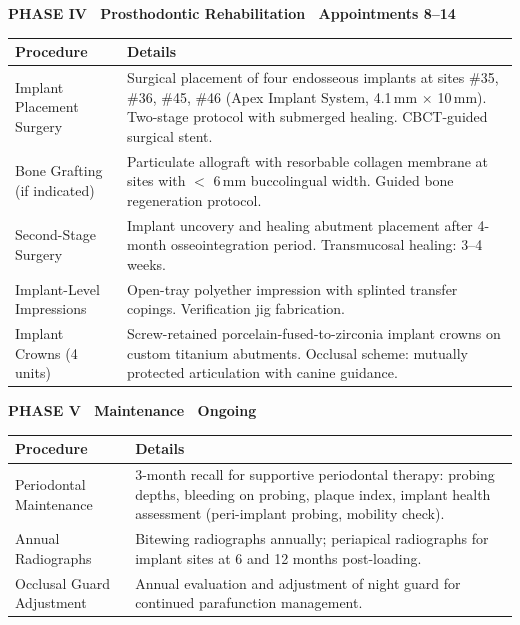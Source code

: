 \documentclass[11pt,a4paper]{article}
\begin{document}
\vspace{3mm}

\begin{phasebox}[colback=success!10, colframe=success!60]
  {\bfseries\color{success!70!black}PHASE IV \textbar\ Prosthodontic Rehabilitation \textbar\ Appointments 8--14}\\[2mm]
  \begin{tabular}{@{}L{7cm} L{7cm}@{}}
    \textbf{Procedure} & \textbf{Details} \\ \midrule
    Implant Placement Surgery & Surgical placement of four endosseous implants at sites \#35, \#36, \#45, \#46 (Apex Implant System, 4.1\,mm $\times$ 10\,mm). Two-stage protocol with submerged healing. CBCT-guided surgical stent. \\
    Bone Grafting (if indicated) & Particulate allograft with resorbable collagen membrane at sites with $<$ 6\,mm buccolingual width. Guided bone regeneration protocol. \\
    Second-Stage Surgery & Implant uncovery and healing abutment placement after 4-month osseointegration period. Transmucosal healing: 3--4 weeks. \\
    Implant-Level Impressions & Open-tray polyether impression with splinted transfer copings. Verification jig fabrication. \\
    Implant Crowns (4 units) & Screw-retained porcelain-fused-to-zirconia implant crowns on custom titanium abutments. Occlusal scheme: mutually protected articulation with canine guidance. \\
  \end{tabular}
\end{phasebox}

\vspace{3mm}

\begin{phasebox}[colback=lightbg, colframe=secondary!50]
  {\bfseries\color{secondary!80!black}PHASE V \textbar\ Maintenance \textbar\ Ongoing}\\[2mm]
  \begin{tabular}{@{}L{7cm} L{7cm}@{}}
    \textbf{Procedure} & \textbf{Details} \\ \midrule
    Periodontal Maintenance & 3-month recall for supportive periodontal therapy: probing depths, bleeding on probing, plaque index, implant health assessment (peri-implant probing, mobility check). \\
    Annual Radiographs & Bitewing radiographs annually; periapical radiographs for implant sites at 6 and 12 months post-loading. \\
    Occlusal Guard Adjustment & Annual evaluation and adjustment of night guard for continued parafunction management. \\
  \end{tabular}
\end{phasebox}
\end{document}
